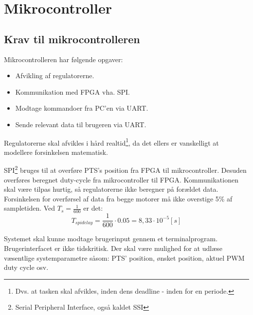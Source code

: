 \section{Mikrocontroller}
\label{sec:mikrocontroller}
%
\subsection{Krav til mikrocontrolleren}
Mikrocontrolleren har følgende opgaver: 


\begin{itemize}
\itemsep1pt
	\item Afvikling af regulatorerne.
	\item Kommunikation med FPGA vha. SPI.
	\item Modtage kommandoer fra PC'en via UART.
	\item Sende relevant data til brugeren via UART.
\end{itemize}

Regulatorerne skal afvikles i hård realtid\footnote{Dvs. at tasken skal afvikles, inden dens deadline - inden for en periode.}, da det ellers er vanskelligt at modellere forsinkelsen matematisk.


SPI\footnote{Serial Peripheral Interface, også kaldet SSI} bruges til at overføre PTS's position fra FPGA til mikrocontroller. Desuden overføres beregnet duty-cycle fra mikrocontroller til FPGA. Kommunikationen skal være tilpas hurtig, så regulatorerne ikke beregner på forældet data. Forsinkelsen for overførsel af data fra begge motorer må ikke overstige 5\% af sampletiden. Ved $T_s = \frac{1}{600}$ er det: 
\begin{equation}
	T_{spi delay} = \frac{1}{600} \cdot 0.05 = 8,33 \cdot 10^{-5}[s]
\end{equation}


Systemet skal kunne modtage brugerinput gennem et terminalprogram. Brugerinterfacet er ikke tidskritisk. Der skal være mulighed for at udlæse væsentlige systemparametre såsom: PTS' position, ønsket position, aktuel PWM duty cycle osv.


